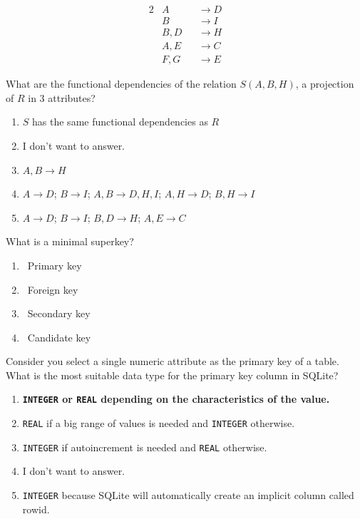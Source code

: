 \documentclass{bdad}
\begin{document}
\begin{alignat*}{2}
    & A    && \rightarrow D \\
    & B    && \rightarrow I \\
    & B, D && \rightarrow H \\
    & A, E && \rightarrow C \\
    & F, G && \rightarrow E
\end{alignat*}

What are the functional dependencies of the relation $S (A, B, H)$, a projection of $R$ in 3 attributes?

\begin{enumerate}
    \item $S$ has the same functional dependencies as $R$
    \item I don't want to answer.
    \item $A, B \rightarrow H$ \greencheckmark
    \item $A\rightarrow D$; $B\rightarrow I$; $A, B \rightarrow  D, H, I$; $A, H\rightarrow D$; $B, H\rightarrow I$
    \item $A\rightarrow D$; $B\rightarrow I$; $B, D\rightarrow  H$; $A, E\rightarrow C$
\end{enumerate}

What is a minimal superkey?

\begin{enumerate}
    \item \boxedredcross      ~Primary key
    \item \boxedredcross      ~Foreign key
    \item \boxedredcross      ~Secondary key
    \item \boxedgreencheckmark~Candidate key
\end{enumerate}

Consider you select a single numeric attribute as the primary key of a table. What is the most suitable data type for the primary key column in SQLite?

\begin{enumerate}
    \item \textbf{\texttt{INTEGER} or \texttt{REAL} depending on the characteristics of the value. \greencheckmark}
    \item \texttt{REAL} if a big range of values is needed and \texttt{INTEGER} otherwise.
    \item \texttt{INTEGER} if autoincrement is needed and \texttt{REAL} otherwise.
    \item I don't want to answer.
    \item \texttt{INTEGER} because SQLite will automatically create an implicit column called rowid.
\end{enumerate}
\end{document}
